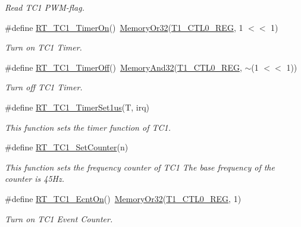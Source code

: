 \begin{DoxyCompactItemize}
\begin{DoxyCompactList}\small\item\em Read T\+C1 P\+W\+M-\/flag. \end{DoxyCompactList}\item 
\#define \mbox{\hyperlink{a00044_ac76393581e0b1d58a9628139db72cdaf}{R\+T\+\_\+\+T\+C1\+\_\+\+Timer\+On}}()~\mbox{\hyperlink{a00020_a27874a97deab7cecdde5ddecf466e31e}{Memory\+Or32}}(\mbox{\hyperlink{a00020_adadaa0ab1ebbd7ba9b70dfd24c3ed44da38632250c2e72df96fcaa3f8bd8ecc5e}{T1\+\_\+\+C\+T\+L0\+\_\+\+R\+EG}}, 1 $<$$<$ 1)
\begin{DoxyCompactList}\small\item\em Turn on T\+C1 Timer. \end{DoxyCompactList}\item 
\#define \mbox{\hyperlink{a00044_a1bccbc833364c4f1c6ce63a758136817}{R\+T\+\_\+\+T\+C1\+\_\+\+Timer\+Off}}()~\mbox{\hyperlink{a00020_ad87cedffcaadc51db22594fce55173d4}{Memory\+And32}}(\mbox{\hyperlink{a00020_adadaa0ab1ebbd7ba9b70dfd24c3ed44da38632250c2e72df96fcaa3f8bd8ecc5e}{T1\+\_\+\+C\+T\+L0\+\_\+\+R\+EG}}, $\sim$(1 $<$$<$ 1))
\begin{DoxyCompactList}\small\item\em Turn off T\+C1 Timer. \end{DoxyCompactList}\item 
\#define \mbox{\hyperlink{a00044_a69c07e4e9fc56ae94d167f79399e7867}{R\+T\+\_\+\+T\+C1\+\_\+\+Timer\+Set1us}}(T,  irq)
\begin{DoxyCompactList}\small\item\em This function sets the timer function of T\+C1. \end{DoxyCompactList}\item 
\#define \mbox{\hyperlink{a00044_ac04f2d9427689062596382399aa7d909}{R\+T\+\_\+\+T\+C1\+\_\+\+Set\+Counter}}(n)
\begin{DoxyCompactList}\small\item\em This function sets the frequency counter of T\+C1 The base frequency of the counter is 45\+Hz. \end{DoxyCompactList}\item 
\#define \mbox{\hyperlink{a00044_add9b6f778a744d79226f5165a04a38d9}{R\+T\+\_\+\+T\+C1\+\_\+\+Ecnt\+On}}()~\mbox{\hyperlink{a00020_a27874a97deab7cecdde5ddecf466e31e}{Memory\+Or32}}(\mbox{\hyperlink{a00020_adadaa0ab1ebbd7ba9b70dfd24c3ed44da38632250c2e72df96fcaa3f8bd8ecc5e}{T1\+\_\+\+C\+T\+L0\+\_\+\+R\+EG}}, 1)
\begin{DoxyCompactList}\small\item\em Turn on T\+C1 Event Counter. \end{DoxyCompactList}\item 

\end{DoxyCompactItemize}
